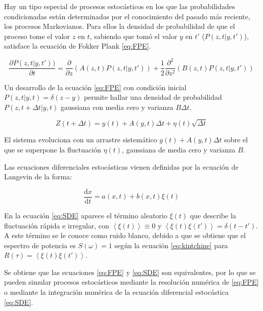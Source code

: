Hay un tipo especial de procesos estocásticos en los que las probabilidades condicionadas están determinadas por el conocimiento del pasado más reciente, los procesos Markovianos. Para ellos la densidad de probabilidad de que el proceso tome el valor $z$ en $t$, sabiendo que tomó el valor $y$ en $t'$ ($P(z, t| y, t')$), satisface la ecuaci\'on de Fokker Plank \ref{eq:FPE}.

	\begin{equation}
		\frac{\partial P(z, t|y, t'))}{\partial t} = \frac{\partial }{\partial z}\left(A(z, t)P(z, t|y, t') \right ) + \frac{1}{2} \frac{\partial^2 }{\partial z^2}\left(B(z, t)P(z, t|y, t') \right )	
		\label{eq:FPE}
	\end{equation}

Un desarrollo de la ecuaci\'on \ref{eq:FPE} con condición inicial $P(z, t|y, t) = \delta(z-y)$ permite hallar una densidad de probabilidad $P(z, t+\Delta t | y, t)$ gaussiana con media cero y varianza $B\Delta t$.

	\begin{equation}
		Z(t+\Delta t) = y(t) + A(y, t)\Delta t + \eta(t) \sqrt{\Delta t}
	\end{equation}

El sistema evoluciona con un arrastre sistem\'atico $y(t) + A(y, t)\Delta t$ sobre el que se superpone la fluctuaci\'on $\eta(t)$, gaussiana de media cero y varianza $B$.

Las ecuaciones diferenciales estoc\'asticas vienen definidas por la ecuaci\'on de Langevin de la forma:

	\begin{equation}
		\frac{\mathrm{d} x}{\mathrm{d} t} = a(x, t) + b(x, t) \xi(t)
		\label{eq:SDE}
	\end{equation}

En la ecuaci\'on \ref{eq:SDE} aparece el t\'ermino aleatorio $\xi(t)$ que describe la fluctuaci\'on r\'apida e irregular, con $\left \langle \xi(t) \right \rangle \equiv 0$ y $\left \langle \xi(t)\xi(t') \right \rangle = \delta(t-t')$. A este t\'ermino se le conoce como ruido blanco, debido a que se obtiene que el espectro de potencia es $S(\omega) = 1$ seg\'un la ecuaci\'on \ref{eq:kintchine} para $R(\tau) = \left \langle \xi(t)\xi(t') \right \rangle$.

Se obtiene que las ecuaciones \ref{eq:FPE} y \ref{eq:SDE} son equivalentes, por lo que se pueden simular procesos estoc\'asticos mediante la resoluci\'on num\'erica de \ref{eq:FPE} o mediante la integraci\'on num\'erica de la ecuaci\'on diferencial estoc\'astica \ref{eq:SDE}. 

